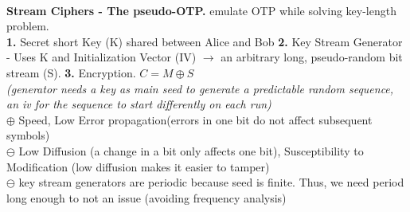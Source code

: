 \documentclass[main.tex]{subfiles}
\begin{document}
\begin{minipage}[t]{0.495\textwidth}
\begin{minipage}[t]{0.59\textwidth}
	\end{minipage}\\\hline
	\textbf{Stream Ciphers - The pseudo-OTP.} emulate OTP while solving key-length problem.\\
	\textbf{1.} Secret short Key (K) shared between Alice and Bob \quad \textbf{2.} Key Stream Generator - Uses K and Initialization Vector (IV) $\rightarrow$ an arbitrary long, pseudo-random bit stream (S). \quad \textbf{3.} Encryption. $C = M \oplus S$\\
	\textit{(generator needs a key as main seed to generate a predictable random sequence, an iv for the sequence to start differently on each run)}\\
	$\oplus$ Speed, Low Error propagation(errors in one bit do not affect subsequent symbols)\\
	$\ominus$ Low Diffusion (a change in a bit only affects one bit), Susceptibility to Modification (low diffusion makes it easier to tamper)\\
	$\ominus$ key stream generators are periodic because seed is finite. Thus, we need period long enough to not an issue (avoiding frequency analysis)\\
\end{minipage}
\end{document}

